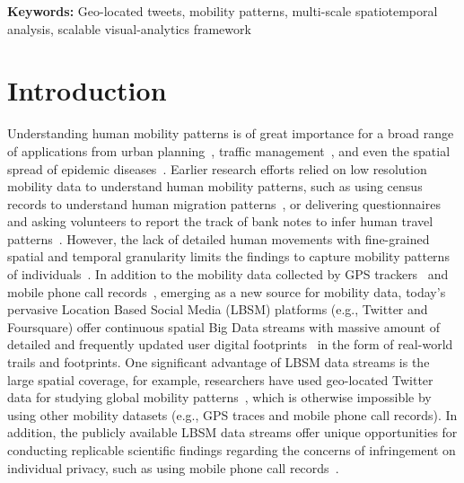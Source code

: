 \documentclass[a4paper, 11pt]{article}
\begin{document}
\noindent\textbf{Keywords:} Geo-located tweets, mobility patterns, multi-scale spatiotemporal analysis, scalable visual-analytics framework\\
\cleardoublepage

\setcounter{page}{1}
\onehalfspacing

\section{Introduction}
Understanding human mobility patterns is of great importance for a broad range of applications from urban planning~\citep{zheng2008understanding}, traffic management~\citep{jiang2009characterizing}, and even the spatial spread of epidemic diseases~\citep{belik2011natural}.
Earlier research efforts relied on low resolution mobility data to understand human mobility patterns, such as using census records to understand human migration patterns~\citep{greenwood1985human}, or delivering questionnaires and asking volunteers to report the track of bank notes to infer human travel patterns~\citep{brockmann2006scaling}.
However, the lack of detailed human movements with fine-grained spatial and temporal granularity limits the findings to capture mobility patterns of individuals~\citep{gonzalez2008understanding,Jurdak2015}.
In addition to the mobility data collected by GPS trackers~\citep{zheng2008understanding, rhee2011levy} and mobile phone call records~\citep{gonzalez2008understanding,sevtsuk2010does,kung2014exploring}, 
emerging as a new source for mobility data, today's pervasive Location Based Social Media (LBSM) platforms (e.g., Twitter and Foursquare) offer continuous spatial Big Data streams with massive amount of detailed and frequently updated user digital footprints~\citep{thatcher2014living} in the form of real-world trails and footprints.
One significant advantage of LBSM data streams is the large spatial coverage, for example, researchers have used geo-located Twitter data for studying global mobility patterns~\citep{hawelka2014geo}, which is otherwise impossible by using other mobility datasets (e.g., GPS traces and mobile phone call records). 
In addition, the publicly available LBSM data streams offer unique opportunities for conducting replicable scientific findings regarding the concerns of infringement on individual privacy, such as using mobile phone call records~\citep{giannotti2008mobility,crampton2014collect,Jurdak2015}.
\end{document}

